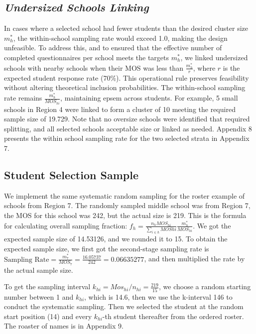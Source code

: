 \documentclass[
  12pt]{article}
\begin{document}
\subsection{\texorpdfstring{\emph{Undersized Schools
Linking}}{Undersized Schools Linking}}\label{undersized-schools-linking}

In cases where a selected school had fewer students than the desired
cluster size \(m^*_h\), the within-school sampling rate would exceed
1.0, making the design unfeasible. To address this, and to ensured that
the effective number of completed questionnaires per school meets the
targets \(m^*_h\), we linked undersized schools with nearby schools when
their MOS was less than \(\frac{m^*_h}{r}\), where \(r\) is the expected
student response rate (70\%). This operational rule preserves
feasibility without altering theoretical inclusion probabilities. The
within-school sampling rate remains \(\frac{m^*_h}{MOS_{hi}}\),
maintaining epsem across students. For example, 5 small schools in
Region 4 were linked to form a cluster of 10 meeting the required sample
size of 19.729. Note that no oversize schools were identified that
required splitting, and all selected schools acceptable size or linked
as needed. Appendix 8 presents the within school sampling rate for the
two selected strata in Appendix 7.

\subsection{Student Selection Sample}\label{student-selection-sample}

We implement the same systematic random sampling for the roster example
of schools from Region 7. The randomly sampled middle school was from
Region 7, the MOS for this school was 242, but the actual size is 219.
This is the formula for calculating overall sampling fraction:
\(f_h = \frac{n_h MOS_{hi} }{\sum_{i \in h} MOS{hi} } \frac{m^*_h}{MOS_{hi}}\).
We got the expected sample size of 14.53126, and we rounded it to 15. To
obtain the expected sample size, we first got the second-stage sampling
rate is
\(\text{Sampling Rate} = \frac{m^*_{7}}{MOS_7} = \frac{16.05737}{242} = 0.06635277\),
and then multiplied the rate by the actual sample size.

To get the sampling interval
\(k_{hi} = Mos_{hi} / n_{hi} = \frac{219}{15}\), we choose a random
starting number between 1 and \(k_{hi}\), which is 14.6, then we use the
k-interval 146 to conduct the systematic sampling. Then we selected the
student at the random start position (14) and every \(k_{hi}\)-th
student thereafter from the ordered roster. The roaster of names is in
Appendix 9.
\end{document}
